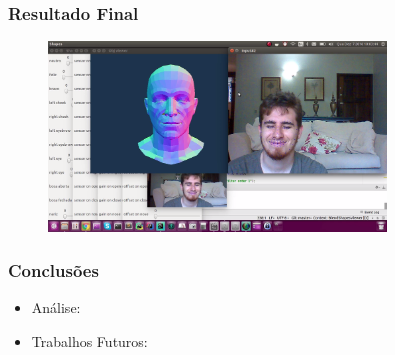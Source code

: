 \documentclass[brazil]{beamer}
\begin{document}
\begin{frame}
\frametitle{Resultado Final}

	\begin{figure}
        \centering
        \includegraphics[width = 0.8\textwidth, keepaspectratio]{./img/result-1.png}
      \end{figure}
\end{frame}


\begin{frame}
\frametitle{Conclusões}
  \begin{itemize}
      \item Análise:
      
      \item Trabalhos Futuros:
              
  \end{itemize} 
\end{frame}
\end{document}
